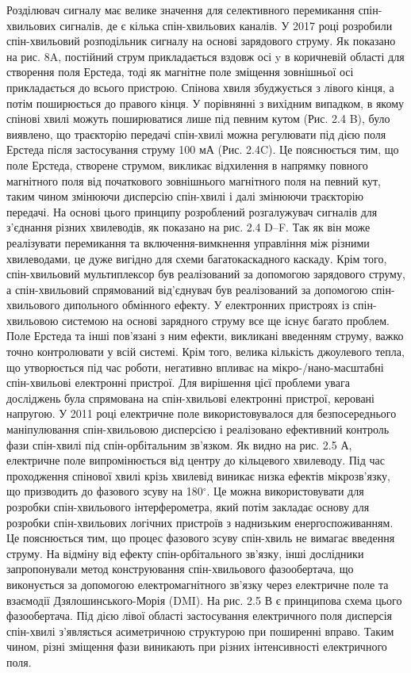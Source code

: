 \documentclass[a4paper,14pt]{extreport}
\begin{document}
 Розділювач сигналу має велике значення для селективного перемикання спін-хвильових сигналів, де є кілька спін-хвильових каналів. У 2017 році розробили спін-хвильовий розподільник сигналу на основі зарядового струму. Як показано на рис. 8A, постійний струм прикладається вздовж осі y в коричневій області для створення поля Ерстеда, тоді як магнітне поле зміщення зовнішньої осі прикладається до всього пристрою. Спінова хвиля збуджується з лівого кінця, а потім поширюється до правого кінця. У порівнянні з вихідним випадком, в якому спінові хвилі можуть поширюватися лише під певним кутом (Рис. 2.4 B), було виявлено, що траєкторію передачі спін-хвилі можна регулювати під дією поля Ерстеда після застосування струму 100 мА (Рис. 2.4C). Це пояснюється тим, що поле Ерстеда, створене струмом, викликає відхилення в напрямку повного магнітного поля від початкового зовнішнього магнітного поля на певний кут, таким чином змінюючи дисперсію спін-хвилі і далі змінюючи траєкторію передачі. На основі цього принципу розроблений розгалужувач сигналів для з’єднання різних хвилеводів, як показано на рис. 2.4 D–F. Так як він може реалізувати перемикання та включення-вимкнення управління між різними хвилеводами, це дуже вигідно для схеми багатокаскадного каскаду. Крім того, спін-хвильовий мультиплексор був реалізований за допомогою зарядового струму, а спін-хвильовий спрямований від’єднувач був реалізований за допомогою спін-хвильового дипольного обмінного ефекту. У електронних пристроях із спін-хвильовою системою на основі зарядного струму все ще існує багато проблем. Поле Ерстеда та інші пов’язані з ним ефекти, викликані введенням струму, важко точно контролювати у всій системі. Крім того, велика кількість джоулевого тепла, що утворюється під час роботи, негативно впливає на мікро-/нано-масштабні спін-хвильові електронні пристрої. Для вирішення цієї проблеми увага досліджень була спрямована на спін-хвильові електронні пристрої, керовані напругою. У 2011 році електричне поле використовувалося для безпосереднього маніпулювання спін-хвильовою дисперсією і реалізовано ефективний контроль фази спін-хвилі під спін-орбітальним зв’язком. Як видно на рис. 2.5 А, електричне поле випромінюється від центру до кільцевого хвилеводу. Під час проходження спінової хвилі крізь хвилевід виникає низка ефектів мікрозв’язку, що призводить до фазового зсуву на 180$^\circ$. Це можна використовувати для розробки спін-хвильового інтерферометра, який потім закладає основу для розробки спін-хвильових логічних пристроїв з наднизьким енергоспоживанням. Це пояснюється тим, що процес фазового зсуву спін-хвиль не вимагає введення струму. На відміну від ефекту спін-орбітального зв’язку, інші дослідники запропонували метод конструювання спін-хвильового фазообертача, що виконується за допомогою електромагнітного зв’язку через електричне поле та взаємодії Дзялошинського-Морія (DMI). На рис. 2.5 В є принципова схема цього фазообертача. Під дією лівої області застосування електричного поля дисперсія спін-хвилі з'являється асиметричною структурою при поширенні вправо. Таким чином, різні зміщення фази виникають при різних інтенсивності електричного поля.
\end{document}
